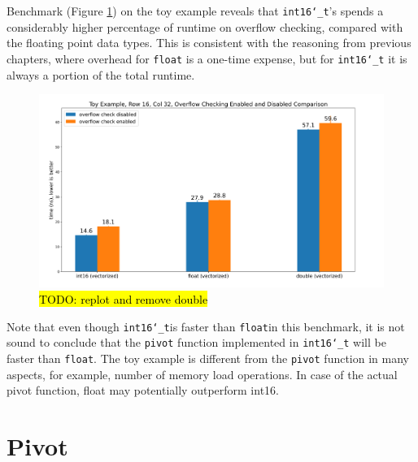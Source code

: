 \documentclass[logo,bsc,singlespacing,parskip]{infthesis}
\newcommand{\dtshort}{\texttt{int16\char`_t}}
\newcommand{\dtfloat}{\texttt{float}}
\newcommand{\pivot}{\texttt{pivot}}
\begin{document}

Benchmark (Figure \ref{fig:i16-f32}) on the toy example reveals that \dtshort{}'s
spends a considerably higher percentage of runtime on overflow checking,
compared with the floating point data types. This is consistent with the
reasoning from previous chapters, where overhead for \dtfloat{} is a one-time
expense, but for \dtshort{} it is always a portion of the total runtime. 

\begin{figure}
    \includegraphics[width=\linewidth]{image/i16-f32.png}
    \caption{\hl{TODO: replot and remove double}}
    \label{fig:i16-f32}
\end{figure}

Note that even though \dtshort is faster than \dtfloat in this benchmark, it is
not sound to conclude that the \texttt{pivot} function implemented in \dtshort
will be faster than \dtfloat. The toy example is different from the \pivot
function in many aspects, for example, number of memory load operations. In case
of the actual pivot function, float may potentially outperform int16. 




\chapter{Pivot}
\end{document}
